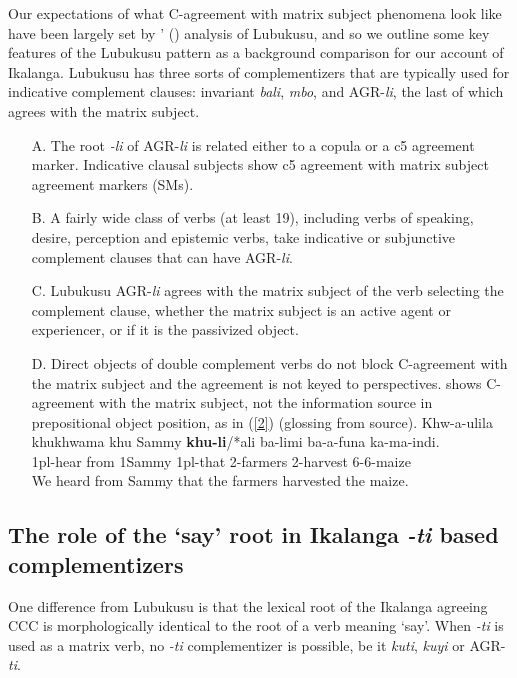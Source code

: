 \documentclass[output=paper,
modfonts
]{langscibook}
\begin{document}
Our expectations of what C-agreement with matrix subject phenomena look like have been largely set by \citeauthor{Diercks2013}' (\citeyear{Diercks2013}) analysis of Lubukusu, and so we outline some key features of the Lubukusu pattern as a background comparison for our account of Ikalanga. Lubukusu has three sorts of complementizers that are typically used for indicative complement clauses: invariant \textit{bali}, \textit{mbo}, and AGR-\textit{li}, the last of which agrees with the matrix subject. 
\begin{enumerate}
\item[A.] The root \textit{-li} of AGR-\textit{li} is related either to a copula or a c5 agreement marker. Indicative clausal subjects show c5 agreement with matrix subject agreement markers (SMs). 
\item[B.] A fairly wide class of verbs (at least 19), including verbs of speaking, desire, perception and epistemic verbs, take indicative or subjunctive complement clauses that can have AGR-\textit{li}. 
\item[C.] Lubukusu AGR-\textit{li} agrees with the matrix subject of the verb selecting the complement clause, whether the matrix subject is an active agent or experiencer, or if it is the passivized object.
\item[D.] Direct objects of double complement verbs do not block C-agreement with the matrix subject and the agreement is not keyed to perspectives. \citet{Diercks2013} shows C-agreement with the matrix subject, not the information source in prepositional object position, as in (\ref{2}) (glossing from source).
\ea \label{2}
\gll Khw-a-ulila  khukhwama khu Sammy  \textbf{khu-li}/*ali ba-limi   ba-a-funa ka-ma-indi. \\
1pl-hear from   1Sammy 1pl-that  2-farmers 2-harvest 6-6-maize \\
\glt We heard from Sammy that the farmers harvested the maize.
\z
\end{enumerate}

\subsection{The role of the `say' root in Ikalanga \textit{-ti} based complementizers}

One difference from Lubukusu is that the lexical root of the Ikalanga agreeing CCC is morphologically identical to the root of a verb meaning ‘say’. When \textit{-ti} is used as a matrix verb, no \textit{-ti}  complementizer is possible, be it \textit{kuti}, \textit{kuyi} or AGR-\textit{ti}.
\end{document}
